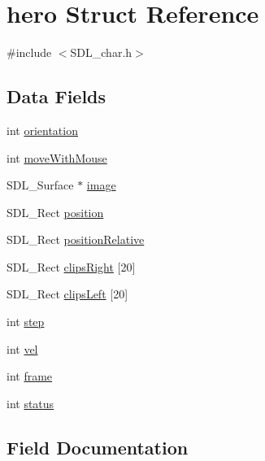 \hypertarget{structhero}{}\section{hero Struct Reference}
\label{structhero}


{\ttfamily \#include $<$S\+D\+L\+\_\+char.\+h$>$}

\subsection*{Data Fields}
\begin{DoxyCompactItemize}
\item 
int \mbox{\hyperlink{structhero_aeec4ea52e8f6b9f1a0b45d8219210da1}{orientation}}
\item 
int \mbox{\hyperlink{structhero_a97ebbee1d5278dd8b9079b96d1603588}{move\+With\+Mouse}}
\item 
S\+D\+L\+\_\+\+Surface $\ast$ \mbox{\hyperlink{structhero_aed2e9c21cff3178bfb3253b278221f5d}{image}}
\item 
S\+D\+L\+\_\+\+Rect \mbox{\hyperlink{structhero_a0bacee409a7f3adbb86669712a83ec31}{position}}
\item 
S\+D\+L\+\_\+\+Rect \mbox{\hyperlink{structhero_a3b8e1b3b93eb28871f9b03e360857ec4}{position\+Relative}}
\item 
S\+D\+L\+\_\+\+Rect \mbox{\hyperlink{structhero_ae19015eb476dc86aea435dfa53b46905}{clips\+Right}} \mbox{[}20\mbox{]}
\item 
S\+D\+L\+\_\+\+Rect \mbox{\hyperlink{structhero_a0f3354c05816a6a55208c1ff7ece036f}{clips\+Left}} \mbox{[}20\mbox{]}
\item 
int \mbox{\hyperlink{structhero_a8ac297ec48dd04afbf3c8bebd513eb0a}{step}}
\item 
int \mbox{\hyperlink{structhero_af1040b37d461b8ebee7143a9361bc986}{vel}}
\item 
int \mbox{\hyperlink{structhero_a8affba68a94772ef439a2ee68b244ff8}{frame}}
\item 
int \mbox{\hyperlink{structhero_a8b17e22b91882ecdd12171b68d512d04}{status}}
\end{DoxyCompactItemize}


\subsection{Field Documentation}
\mbox{\label{structhero_a0f3354c05816a6a55208c1ff7ece036f}} 
